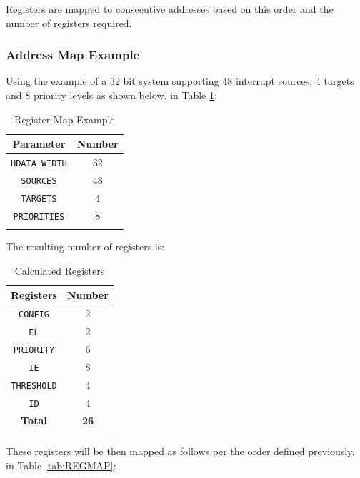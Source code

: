 Registers are mapped to consecutive addresses based on this order and the
number of registers required.  

\subsubsection{Address Map Example}

Using the example of a 32 bit system supporting 48 interrupt sources, 4 targets and 8 priority levels as shown 
\ifdefined\MARKDOWN
below.
\else
in Table \ref{tab:REGMAPEX}:
\fi

\begin{longtable}[c]{@{}cc@{}}	
		\toprule 
		\textbf{Parameter}    & \textbf{Number}\\
		\midrule 
		\endhead
		\texttt{HDATA\_WIDTH} & 32\\
		\texttt{SOURCES}      & 48\\
		\texttt{TARGETS}      & 4\\
		\texttt{PRIORITIES}   & 8\\
		\bottomrule 	
 
	\caption{Register Map Example}
	\label{tab:REGMAPEX}
\end{longtable}

The resulting number of registers is:

\begin{longtable}[c]{@{}cc@{}}	
		\toprule 
		\textbf{Registers} & \textbf{Number}\\
		\midrule 
		\endhead
		\texttt{CONFIG}    & 2\\
		\texttt{EL}        & 2\\
		\texttt{PRIORITY}  & 6\\
		\texttt{IE}        & 8\\
		\texttt{THRESHOLD} & 4\\
		\texttt{ID}        & 4\\
		\midrule
		\textbf{Total}     & \textbf{26}\\
		\bottomrule 	
	\caption{Calculated Registers}
	\label{tab:REGMAPNUM}
\end{longtable}

These registers will be then mapped as follows per the order defined 
\ifdefined\MARKDOWN
previously.
\else
in Table \ref{tab:REGMAP}:
\fi

